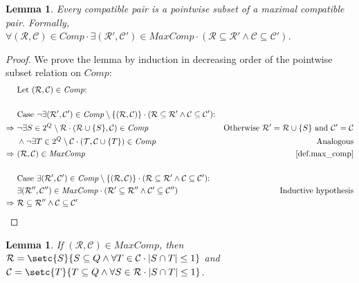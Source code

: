 \documentclass{report}
\DeclarePairedDelimiter{\set}{\{}{\}}
\DeclarePairedDelimiter{\abs}{\lvert}{\rvert}
\newtheorem{lemma}[theorem]{Lemma}
\theoremstyle{definition}
\begin{document}
\begin{lemma} \label{lma.comp_pointwise_subset}
Every compatible pair is a pointwise subset of a maximal compatible pair.
Formally, $\forall (\mathcal{R}, \mathcal{C}) \in \mathit{Comp} \cdot \exists
(\mathcal{R}', \mathcal{C}') \in \mathit{MaxComp} \cdot (\mathcal{R} \subseteq \mathcal{R}'
\wedge \mathcal{C} \subseteq \mathcal{C}')$.
\end{lemma}

\begin{proof}
We prove the lemma by induction in decreasing order of the pointwise subset
relation on $\mathit{Comp}$:
\begin{align*}
& \text{Let } (\mathcal{R}, \mathcal{C}) \in \mathit{Comp} \text{:} \\
\\
& \text{Case } \neg \exists (\mathcal{R}', \mathcal{C}') \in
\mathit{Comp} \setminus \set{(\mathcal{R}, \mathcal{C})} \cdot
(\mathcal{R} \subseteq \mathcal{R}' \wedge \mathcal{C} \subseteq \mathcal{C}')
\text{:} \\
\Rightarrow \ & \neg \exists S \in 2^Q \setminus \mathcal{R} \cdot
(\mathcal{R} \cup \set{S}, \mathcal{C}) \in \mathit{Comp}
& \text{Otherwise } \mathcal{R}' = \mathcal{R} \cup \set{S}
\text{ and } \mathcal{C}' = \mathcal{C} \\
& \wedge \neg \exists T \in 2^Q \setminus \mathcal{C} \cdot
(\mathcal{T}, \mathcal{C} \cup \set{T}) \in \mathit{Comp}
& \text{Analogous} \\
\Rightarrow \ & (\mathcal{R}, \mathcal{C}) \in \mathit{MaxComp}
& \text{\cref{def.max_comp}} \\
\\
& \text{Case } \exists (\mathcal{R}', \mathcal{C}') \in
\mathit{Comp} \setminus \set{(\mathcal{R}, \mathcal{C})} \cdot
(\mathcal{R} \subseteq \mathcal{R}' \wedge \mathcal{C} \subseteq \mathcal{C}')
\text{:} \\
& \exists (\mathcal{R}'', \mathcal{C}'') \in \mathit{MaxComp} \cdot
(\mathcal{R}' \subseteq \mathcal{R}'' \wedge \mathcal{C}' \subseteq \mathcal{C}'')
& \text{Inductive hypothesis} \\
\Rightarrow \ &
\mathcal{R} \subseteq \mathcal{R}'' \wedge \mathcal{C} \subseteq \mathcal{C}'
\end{align*}
\end{proof}

\begin{lemma} \label{lma.max_comp_alternative}
If $(\mathcal{R}, \mathcal{C}) \in \mathit{MaxComp}$, then
$\mathcal{R} = \setc{S}{S \subseteq Q \wedge \forall T \in \mathcal{C} \cdot
\abs{S \cap T} \leq 1}$
and
$\mathcal{C} = \setc{T}{T \subseteq Q \wedge \forall S \in \mathcal{R} \cdot
\abs{S \cap T} \leq 1}$.
\end{lemma}
\end{document}
